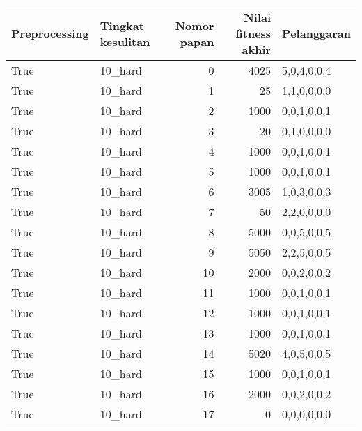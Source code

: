 \begin{tabular}{llrrl}
\hline
 Preprocessing   & Tingkat kesulitan   &   Nomor papan &   Nilai fitness akhir & Pelanggaran   \\
\hline
 True            & 10\_hard             &             0 &                  4025 & 5,0,4,0,0,4   \\
 True            & 10\_hard             &             1 &                    25 & 1,1,0,0,0,0   \\
 True            & 10\_hard             &             2 &                  1000 & 0,0,1,0,0,1   \\
 True            & 10\_hard             &             3 &                    20 & 0,1,0,0,0,0   \\
 True            & 10\_hard             &             4 &                  1000 & 0,0,1,0,0,1   \\
 True            & 10\_hard             &             5 &                  1000 & 0,0,1,0,0,1   \\
 True            & 10\_hard             &             6 &                  3005 & 1,0,3,0,0,3   \\
 True            & 10\_hard             &             7 &                    50 & 2,2,0,0,0,0   \\
 True            & 10\_hard             &             8 &                  5000 & 0,0,5,0,0,5   \\
 True            & 10\_hard             &             9 &                  5050 & 2,2,5,0,0,5   \\
 True            & 10\_hard             &            10 &                  2000 & 0,0,2,0,0,2   \\
 True            & 10\_hard             &            11 &                  1000 & 0,0,1,0,0,1   \\
 True            & 10\_hard             &            12 &                  1000 & 0,0,1,0,0,1   \\
 True            & 10\_hard             &            13 &                  1000 & 0,0,1,0,0,1   \\
 True            & 10\_hard             &            14 &                  5020 & 4,0,5,0,0,5   \\
 True            & 10\_hard             &            15 &                  1000 & 0,0,1,0,0,1   \\
 True            & 10\_hard             &            16 &                  2000 & 0,0,2,0,0,2   \\
 True            & 10\_hard             &            17 &                     0 & 0,0,0,0,0,0   \\

\end{tabular}
